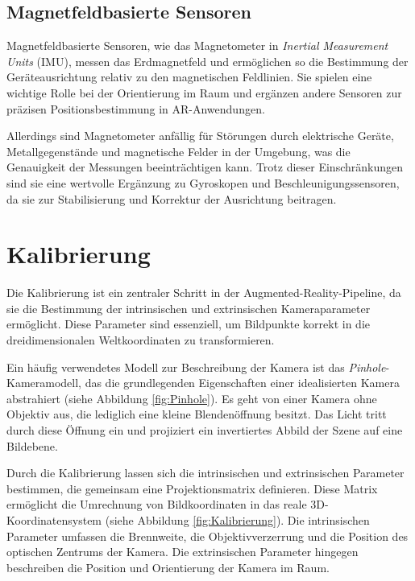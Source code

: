 \subsection{Magnetfeldbasierte Sensoren}

Magnetfeldbasierte Sensoren, wie das Magnetometer in \emph{Inertial Measurement Units} (IMU), messen das Erdmagnetfeld und ermöglichen so die Bestimmung der Geräteausrichtung relativ zu den magnetischen Feldlinien. Sie spielen eine wichtige Rolle bei der Orientierung im Raum und ergänzen andere Sensoren zur präzisen Positionsbestimmung in AR-Anwendungen. \cite{doerner2022virtual}

Allerdings sind Magnetometer anfällig für Störungen durch elektrische Geräte, Metallgegenstände und magnetische Felder in der Umgebung, was die Genauigkeit der Messungen beeinträchtigen kann. Trotz dieser Einschränkungen sind sie eine wertvolle Ergänzung zu Gyroskopen und Beschleunigungssensoren, da sie zur Stabilisierung und Korrektur der Ausrichtung beitragen. \cite{doerner2022virtual}

\section{Kalibrierung}\label{Kalibrierung}

Die Kalibrierung ist ein zentraler Schritt in der Augmented-Reality-Pipeline, da sie die Bestimmung der intrinsischen und extrinsischen Kameraparameter ermöglicht. Diese Parameter sind essenziell, um Bildpunkte korrekt in die dreidimensionalen Weltkoordinaten zu transformieren. \cite{mw2024calibration}

Ein häufig verwendetes Modell zur Beschreibung der Kamera ist das \emph{Pinhole}-Kameramodell, das die grundlegenden Eigenschaften einer idealisierten Kamera abstrahiert (siehe Abbildung \ref{fig:Pinhole}). Es geht von einer Kamera ohne Objektiv aus, die lediglich eine kleine Blendenöffnung besitzt. Das Licht tritt durch diese Öffnung ein und projiziert ein invertiertes Abbild der Szene auf eine Bildebene. \cite{mw2024calibration}

Durch die Kalibrierung lassen sich die intrinsischen und extrinsischen Parameter bestimmen, die gemeinsam eine Projektionsmatrix definieren. Diese Matrix ermöglicht die Umrechnung von Bildkoordinaten in das reale 3D-Koordinatensystem (siehe Abbildung \ref{fig:Kalibrierung}). Die intrinsischen Parameter umfassen die Brennweite, die Objektivverzerrung und die Position des optischen Zentrums der Kamera. Die extrinsischen Parameter hingegen beschreiben die Position und Orientierung der Kamera im Raum. \cite{mw2024calibration}


